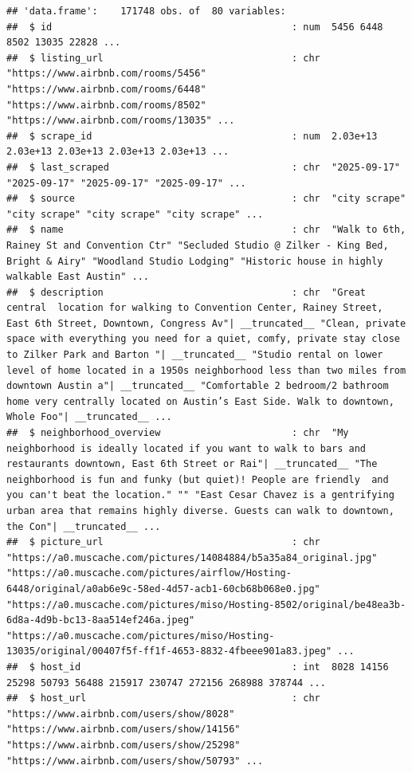 \documentclass[
]{article}
\begin{document}
\begin{verbatim}
## 'data.frame':    171748 obs. of  80 variables:
##  $ id                                          : num  5456 6448 8502 13035 22828 ...
##  $ listing_url                                 : chr  "https://www.airbnb.com/rooms/5456" "https://www.airbnb.com/rooms/6448" "https://www.airbnb.com/rooms/8502" "https://www.airbnb.com/rooms/13035" ...
##  $ scrape_id                                   : num  2.03e+13 2.03e+13 2.03e+13 2.03e+13 2.03e+13 ...
##  $ last_scraped                                : chr  "2025-09-17" "2025-09-17" "2025-09-17" "2025-09-17" ...
##  $ source                                      : chr  "city scrape" "city scrape" "city scrape" "city scrape" ...
##  $ name                                        : chr  "Walk to 6th, Rainey St and Convention Ctr" "Secluded Studio @ Zilker - King Bed, Bright & Airy" "Woodland Studio Lodging" "Historic house in highly walkable East Austin" ...
##  $ description                                 : chr  "Great central  location for walking to Convention Center, Rainey Street, East 6th Street, Downtown, Congress Av"| __truncated__ "Clean, private space with everything you need for a quiet, comfy, private stay close to Zilker Park and Barton "| __truncated__ "Studio rental on lower level of home located in a 1950s neighborhood less than two miles from downtown Austin a"| __truncated__ "Comfortable 2 bedroom/2 bathroom home very centrally located on Austin’s East Side. Walk to downtown, Whole Foo"| __truncated__ ...
##  $ neighborhood_overview                       : chr  "My neighborhood is ideally located if you want to walk to bars and restaurants downtown, East 6th Street or Rai"| __truncated__ "The neighborhood is fun and funky (but quiet)! People are friendly  and you can't beat the location." "" "East Cesar Chavez is a gentrifying urban area that remains highly diverse. Guests can walk to downtown, the Con"| __truncated__ ...
##  $ picture_url                                 : chr  "https://a0.muscache.com/pictures/14084884/b5a35a84_original.jpg" "https://a0.muscache.com/pictures/airflow/Hosting-6448/original/a0ab6e9c-58ed-4d57-acb1-60cb68b068e0.jpg" "https://a0.muscache.com/pictures/miso/Hosting-8502/original/be48ea3b-6d8a-4d9b-bc13-8aa514ef246a.jpeg" "https://a0.muscache.com/pictures/miso/Hosting-13035/original/00407f5f-ff1f-4653-8832-4fbeee901a83.jpeg" ...
##  $ host_id                                     : int  8028 14156 25298 50793 56488 215917 230747 272156 268988 378744 ...
##  $ host_url                                    : chr  "https://www.airbnb.com/users/show/8028" "https://www.airbnb.com/users/show/14156" "https://www.airbnb.com/users/show/25298" "https://www.airbnb.com/users/show/50793" ...

\end{verbatim}
\end{document}
